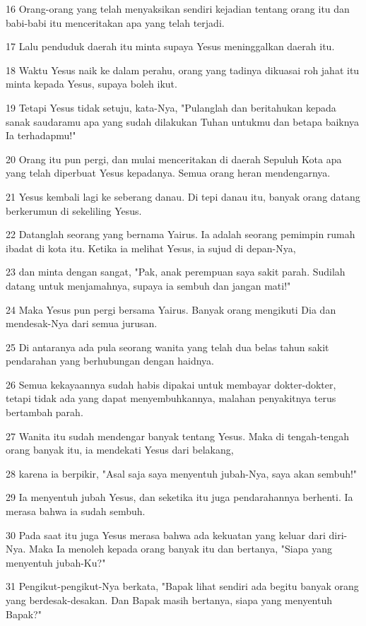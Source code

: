 \par 16 Orang-orang yang telah menyaksikan sendiri kejadian tentang orang itu dan babi-babi itu menceritakan apa yang telah terjadi.
\par 17 Lalu penduduk daerah itu minta supaya Yesus meninggalkan daerah itu.
\par 18 Waktu Yesus naik ke dalam perahu, orang yang tadinya dikuasai roh jahat itu minta kepada Yesus, supaya boleh ikut.
\par 19 Tetapi Yesus tidak setuju, kata-Nya, "Pulanglah dan beritahukan kepada sanak saudaramu apa yang sudah dilakukan Tuhan untukmu dan betapa baiknya Ia terhadapmu!"
\par 20 Orang itu pun pergi, dan mulai menceritakan di daerah Sepuluh Kota apa yang telah diperbuat Yesus kepadanya. Semua orang heran mendengarnya.
\par 21 Yesus kembali lagi ke seberang danau. Di tepi danau itu, banyak orang datang berkerumun di sekeliling Yesus.
\par 22 Datanglah seorang yang bernama Yairus. Ia adalah seorang pemimpin rumah ibadat di kota itu. Ketika ia melihat Yesus, ia sujud di depan-Nya,
\par 23 dan minta dengan sangat, "Pak, anak perempuan saya sakit parah. Sudilah datang untuk menjamahnya, supaya ia sembuh dan jangan mati!"
\par 24 Maka Yesus pun pergi bersama Yairus. Banyak orang mengikuti Dia dan mendesak-Nya dari semua jurusan.
\par 25 Di antaranya ada pula seorang wanita yang telah dua belas tahun sakit pendarahan yang berhubungan dengan haidnya.
\par 26 Semua kekayaannya sudah habis dipakai untuk membayar dokter-dokter, tetapi tidak ada yang dapat menyembuhkannya, malahan penyakitnya terus bertambah parah.
\par 27 Wanita itu sudah mendengar banyak tentang Yesus. Maka di tengah-tengah orang banyak itu, ia mendekati Yesus dari belakang,
\par 28 karena ia berpikir, "Asal saja saya menyentuh jubah-Nya, saya akan sembuh!"
\par 29 Ia menyentuh jubah Yesus, dan seketika itu juga pendarahannya berhenti. Ia merasa bahwa ia sudah sembuh.
\par 30 Pada saat itu juga Yesus merasa bahwa ada kekuatan yang keluar dari diri-Nya. Maka Ia menoleh kepada orang banyak itu dan bertanya, "Siapa yang menyentuh jubah-Ku?"
\par 31 Pengikut-pengikut-Nya berkata, "Bapak lihat sendiri ada begitu banyak orang yang berdesak-desakan. Dan Bapak masih bertanya, siapa yang menyentuh Bapak?"

